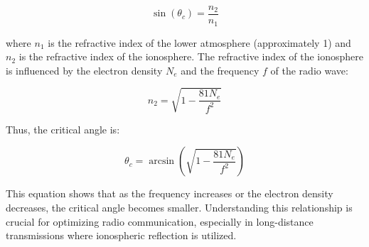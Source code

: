 \[
\sin(\theta_c) = \frac{n_2}{n_1}
\]

where \(n_1\) is the refractive index of the lower atmosphere (approximately 1) and \(n_2\) is the refractive index of the ionosphere. The refractive index of the ionosphere is influenced by the electron density \(N_e\) and the frequency \(f\) of the radio wave:

\[
n_2 = \sqrt{1 - \frac{81N_e}{f^2}}
\]

Thus, the critical angle is:

\[
\theta_c = \arcsin\left(\sqrt{1 - \frac{81N_e}{f^2}}\right)
\]

This equation shows that as the frequency increases or the electron density decreases, the critical angle becomes smaller. Understanding this relationship is crucial for optimizing radio communication, especially in long-distance transmissions where ionospheric reflection is utilized.

